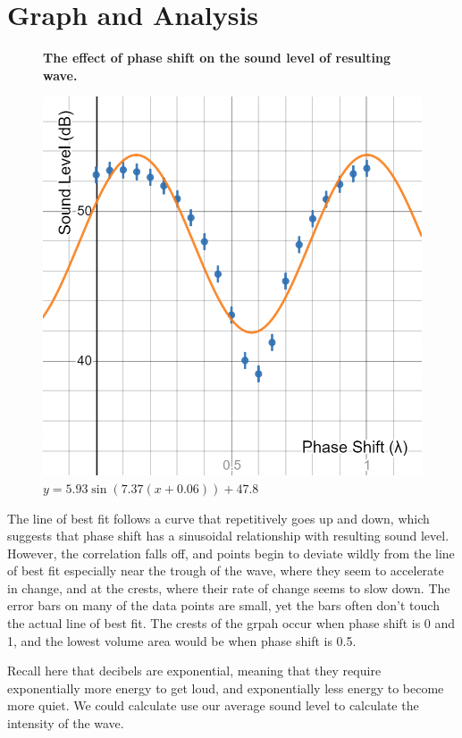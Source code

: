 \documentclass[index]{subfiles}
\begin{document}
\section{Graph and Analysis}

\begin{figure}[H]
    \centering
    \textbf{The effect of phase shift on the sound level of resulting wave.}\medskip\par
    \includegraphics[scale=0.3]{graph.png}
    \caption{\(y=5.93\sin\left(7.37\left(x+0.06\right)\right)+47.8\) }
\end{figure}

The line of best fit follows a curve that repetitively goes up and down, which suggests that phase shift has a sinusoidal relationship with resulting sound level. However, the correlation falls off, and points begin to deviate wildly from the line of best fit especially near the trough of the wave, where they seem to accelerate in change, and at the crests, where their rate of change seems to slow down. The error bars on many of the data points are small, yet the bars often don't touch the actual line of best fit. The crests of the grpah occur when phase shift is 0 and 1, and the lowest volume area would be when phase shift is 0.5.

Recall here that decibels are exponential, meaning that they require exponentially more energy to get loud, and exponentially less energy to become more quiet. We could calculate use our average sound level to calculate the intensity of the wave.
\end{document}
